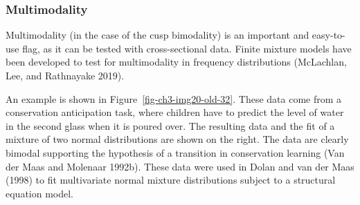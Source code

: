 \documentclass[
  a4paper,
  DIV=11,
  numbers=noendperiod]{scrreprt}
\newenvironment{Shaded}{\begin{snugshade}}{\end{snugshade}}
\newcommand{\AttributeTok}[1]{\textcolor[rgb]{0.40,0.45,0.13}{#1}}
\newcommand{\CommentTok}[1]{\textcolor[rgb]{0.37,0.37,0.37}{#1}}
\newcommand{\DecValTok}[1]{\textcolor[rgb]{0.68,0.00,0.00}{#1}}
\newcommand{\FunctionTok}[1]{\textcolor[rgb]{0.28,0.35,0.67}{#1}}
\newcommand{\NormalTok}[1]{\textcolor[rgb]{0.00,0.23,0.31}{#1}}
\newcommand{\OtherTok}[1]{\textcolor[rgb]{0.00,0.23,0.31}{#1}}
\newcommand{\SpecialCharTok}[1]{\textcolor[rgb]{0.37,0.37,0.37}{#1}}
\newcommand{\StringTok}[1]{\textcolor[rgb]{0.13,0.47,0.30}{#1}}
\begin{document}
\begin{Shaded}
\end{Shaded}

\hypertarget{sec-Multimodality}{%
\subsubsection{Multimodality}\label{sec-Multimodality}}

Multimodality (in the case of the cusp bimodality) is an important and
easy-to-use flag, as it can be tested with cross-sectional data. Finite
mixture models have been developed to test for multimodality in
frequency distributions (McLachlan, Lee, and Rathnayake 2019).

An example is shown in Figure~\ref{fig-ch3-img20-old-32}. These data
come from a conservation anticipation task, where children have to
predict the level of water in the second glass when it is poured over.
The resulting data and the fit of a mixture of two normal distributions
are shown on the right. The data are clearly bimodal supporting the
hypothesis of a transition in conservation learning (Van der Maas and
Molenaar 1992b). These data were used in Dolan and van der Maas (1998)
to fit multivariate normal mixture distributions subject to a structural
equation model.
\end{document}
